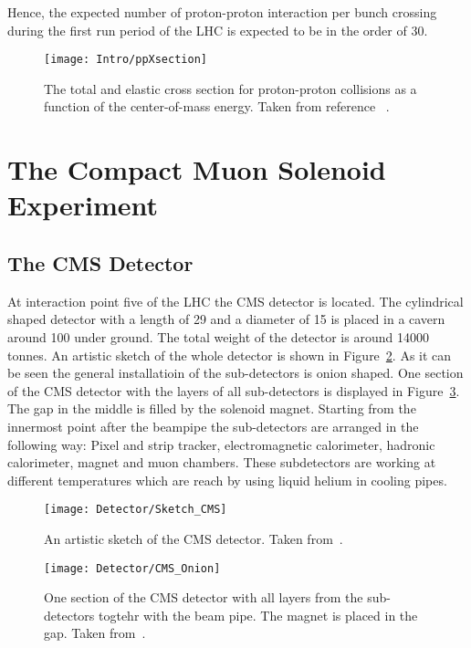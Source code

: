 Hence, the expected number of proton-proton interaction per bunch crossing during the first run period of the LHC is expected to be in the order of 30.

\begin{figure}[!Hhtb]
    \centering
    \texttt{[image: Intro/ppXsection]}
    \caption[Total and elastic cross section for pp interactions]{The total and elastic cross section for proton-proton collisions as a function of the center-of-mass energy. Taken from reference ~.\label{plot:IntroTotalCross}}
\end{figure}

\section{The Compact Muon Solenoid Experiment \label{LHCCMSCMS}}

\subsection{The CMS Detector \label{LHCCMSCMSDet}}

At interaction point five of the LHC the CMS detector is located. The cylindrical shaped detector with a length of 29\m{} and a diameter of 15\m{} is placed in a cavern around 100\m{} under ground. The total weight of the detector is around 14000 tonnes. An artistic sketch of the whole detector is shown in Figure~\ref{plot:LHCCMSWholeCMS}. As it can be seen the general installatioin of the sub-detectors is onion shaped. One section of the CMS detector with the layers of all sub-detectors is displayed in Figure~\ref{plot:LHCCMSOnionCMS}. The gap in the middle is filled by the solenoid magnet. Starting from the innermost point after the beampipe the sub-detectors are arranged in the following way: Pixel and strip tracker, electromagnetic calorimeter, hadronic calorimeter, magnet and muon chambers. These subdetectors are working at different temperatures which are reach by using liquid helium in cooling pipes.

\begin{figure}[!Hhtb]
  \centering
  \texttt{[image: Detector/Sketch\_CMS]}
  \caption[Artistic sketch of the CMS detector]{An artistic sketch of the CMS detector. Taken from~. \label{plot:LHCCMSWholeCMS}}
\end{figure}

\begin{figure}[!Hhtb]
  \centering
  \texttt{[image: Detector/CMS\_Onion]}
  \caption[One section of the CMS detector with all layers]{One section of the CMS detector with all layers from the sub-detectors togtehr with the beam pipe. The magnet is placed in the gap. Taken from~. \label{plot:LHCCMSOnionCMS}}
\end{figure}

